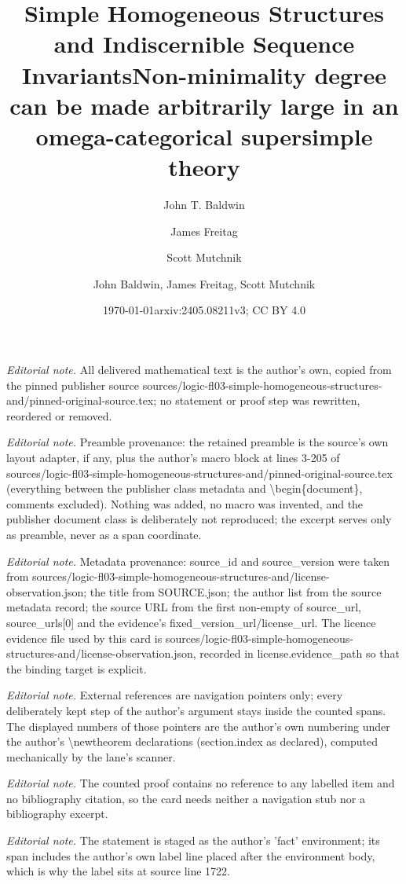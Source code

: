 \documentclass[10pt,a4paper]{amsart}
\title{Simple Homogeneous Structures and Indiscernible Sequence Invariants}
\author[1]{John T. Baldwin}
\author[2]{James Freitag}
\author[3]{Scott Mutchnik}
\date{\today}
\title{Non-minimality degree can be made arbitrarily large in an omega-categorical supersimple theory}
\author{John Baldwin, James Freitag, Scott Mutchnik}
\date{arxiv:2405.08211v3; CC BY 4.0}
\theoremstyle{definition}
\theoremstyle{remark}
\numberwithin{equation}{section}
\begin{document}
\maketitle
\noindent\textit{Editorial note.} All delivered mathematical text is the author's own, copied from the pinned publisher source sources/logic-fl03-simple-homogeneous-structures-and/pinned-original-source.tex; no statement or proof step was rewritten, reordered or removed.\par\medskip
\noindent\textit{Editorial note.} Preamble provenance: the retained preamble is the source's own layout adapter, if any, plus the author's macro block at lines 3-205 of sources/logic-fl03-simple-homogeneous-structures-and/pinned-original-source.tex (everything between the publisher class metadata and \textbackslash{}begin\{document\}, comments excluded). Nothing was added, no macro was invented, and the publisher document class is deliberately not reproduced; the excerpt serves only as preamble, never as a span coordinate.\par\medskip
\noindent\textit{Editorial note.} Metadata provenance: source\_id and source\_version were taken from sources/logic-fl03-simple-homogeneous-structures-and/license-observation.json; the title from SOURCE.json; the author list from the source metadata record; the source URL from the first non-empty of source\_url, source\_urls[0] and the evidence's fixed\_version\_url/license\_url. The licence evidence file used by this card is sources/logic-fl03-simple-homogeneous-structures-and/license-observation.json, recorded in license.evidence\_path so that the binding target is explicit.\par\medskip
\noindent\textit{Editorial note.} External references are navigation pointers only; every deliberately kept step of the author's argument stays inside the counted spans. The displayed numbers of those pointers are the author's own numbering under the author's \textbackslash{}newtheorem declarations (section.index as declared), computed mechanically by the lane's scanner.\par\medskip
\noindent\textit{Editorial note.} The counted proof contains no reference to any labelled item and no bibliography citation, so the card needs neither a navigation stub nor a bibliography excerpt.\par\medskip
\noindent\textit{Editorial note.} The statement is staged as the author's 'fact' environment; its span includes the author's own label line placed after the environment body, which is why the label sits at source line 1722.\par\medskip
\end{document}
